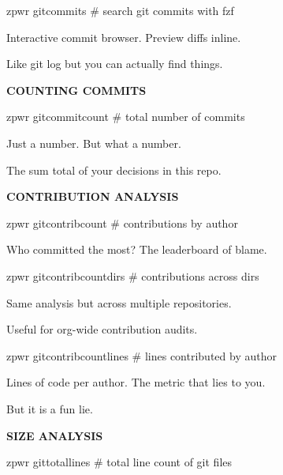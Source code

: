 \documentclass[11pt,a4paper,twoside]{book}
\begin{document}
\begin{codebox}
zpwr gitcommits            \# search git commits with fzf\\
\end{codebox}

Interactive commit browser. Preview diffs inline.

Like git log but you can actually find things.


\vspace{12pt}
{\bfseries\color{neonyellow} COUNTING COMMITS}\vspace{4pt}

\begin{codebox}
zpwr gitcommitcount        \# total number of commits\\
\end{codebox}

Just a number. But what a number.

The sum total of your decisions in this repo.


\vspace{12pt}
{\bfseries\color{neonyellow} CONTRIBUTION ANALYSIS}\vspace{4pt}

\begin{codebox}
zpwr gitcontribcount       \# contributions by author\\
\end{codebox}

Who committed the most? The leaderboard of blame.

\begin{codebox}
zpwr gitcontribcountdirs   \# contributions across dirs\\
\end{codebox}

Same analysis but across multiple repositories.

Useful for org-wide contribution audits.

\begin{codebox}
zpwr gitcontribcountlines  \# lines contributed by author\\
\end{codebox}

Lines of code per author. The metric that lies to you.

But it is a fun lie.


\vspace{12pt}
{\bfseries\color{neonyellow} SIZE ANALYSIS}\vspace{4pt}

\begin{codebox}
zpwr gittotallines         \# total line count of git files\\
\end{codebox}
\end{document}
